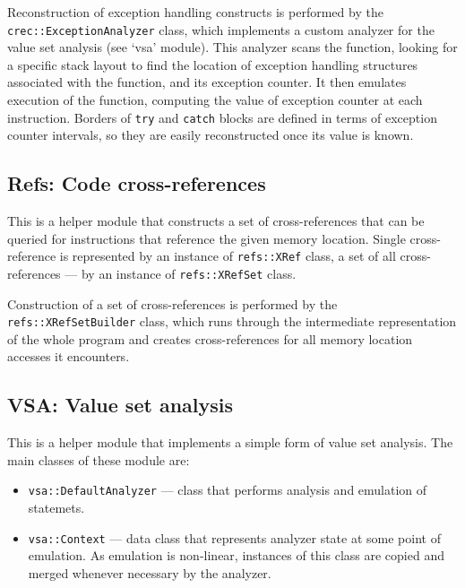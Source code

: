 \documentclass[a4paper,12pt]{article}
\newcommand{\ident}[1]{\texttt{#1}}
\begin{document}
Reconstruction of exception handling constructs is performed by the \ident{crec::ExceptionAnalyzer} class, which implements a custom analyzer for the value set analysis (see `vsa' module). 
This analyzer scans the function, looking for a specific stack layout to find the location of exception handling structures associated with the function, and its exception counter.
It then emulates execution of the function, computing the value of exception counter at each instruction. 
Borders of \ident{try} and \ident{catch} blocks are defined in terms of exception counter intervals, so they are easily reconstructed once its value is known.

\subsection{Refs: Code cross-references}
This is a helper module that constructs a set of cross-references that can be queried for instructions that reference the given memory location. 
Single cross-reference is represented by an instance of \ident{refs::XRef} class, a set of all cross-references --- by an instance of \ident{refs::XRefSet} class.

Construction of a set of cross-references is performed by the \ident{refs::XRefSetBuilder} class, which runs through the intermediate representation of the whole program and creates cross-references for all memory location accesses it encounters.

\subsection{VSA: Value set analysis}
This is a helper module that implements a simple form of value set analysis. The main classes of these module are:
\begin{itemize}
\item \ident{vsa::DefaultAnalyzer} --- class that performs analysis and emulation of statemets. 
\item \ident{vsa::Context} --- data class that represents analyzer state at some point of emulation. As emulation is non-linear, instances of this class are copied and merged whenever necessary by the analyzer.
\end{itemize}
\end{document}
